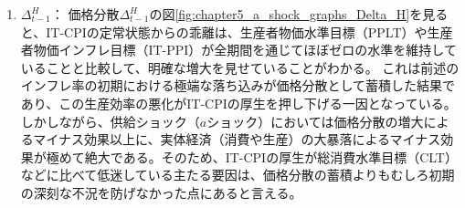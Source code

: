 \begin{enumerate}
        しかし、その後消費者物価を目標水準に引き戻そうとする強力な金融引き締めメカニズムが働くため、インフレ率は直ちに急反落し、極端なマイナス方向（デフレ）へと深く落ち込んでいる。この初期から中盤にかけてのインフレ率の激しい乱高下が次項で述べる価格分散の蓄積をもたらし、結果として厚生を悪化させる要因となっている。
    \item
    \label{itm:chapter5_a_shock_policies_it_cpi_Delta_t_minus_1_H}
        \(\Delta_{t-1}^H\)：
        価格分散\(\Delta_{t-1}^H\)の図\ref{fig:chapter5_a_shock_graphs_Delta_H}を見ると、IT-CPIの定常状態からの乖離は、生産者物価水準目標（PPLT）や生産者物価インフレ目標（IT-PPI）が全期間を通じてほぼゼロの水準を維持していることと比較して、明確な増大を見せていることがわかる。
        これは前述のインフレ率の初期における極端な落ち込みが価格分散として蓄積した結果であり、この生産効率の悪化がIT-CPIの厚生を押し下げる一因となっている。
        しかしながら、供給ショック（\(a\)ショック）においては価格分散の増大によるマイナス効果以上に、実体経済（消費や生産）の大暴落によるマイナス効果が極めて絶大である。そのため、IT-CPIの厚生が総消費水準目標（CLT）などに比べて低迷している主たる要因は、価格分散の蓄積よりもむしろ初期の深刻な不況を防げなかった点にあると言える。
\end{enumerate}
